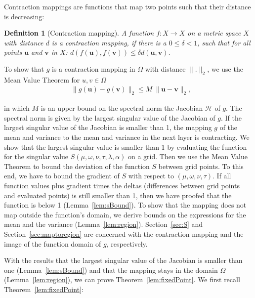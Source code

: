 \documentclass{article}
\newtheorem{definition}{Definition}
\renewcommand{\leq}{\leqslant}
\begin{document}
Contraction mappings are functions that map two points such that their distance is decreasing:
\begin{definition}[Contraction mapping]
 A function $f:X \to X$ on a metric space $X$ with distance $d$ is a contraction mapping, if there
 is a $0 \leq \delta < 1$, such that for all points $\bm u$ and $\bm v$ in $X$:
 $d(f(\bm u),f(\bm v)) \leq \delta d(\bm u,\bm v)$.
\end{definition}


To show that $g$ is a contraction mapping in $\Omega$ with distance $\| . \|_2$, we use the Mean Value 
Theorem for $u,v \in \Omega$
\begin{align}
& \| g(\bm u) - g(\bm v) \|_2 \leq  M  \     \| \bm u - \bm v \|_2, 
\end{align}

in which $M$ is an upper bound on the spectral norm the Jacobian $\mathcal H$ of $g$.
The spectral norm is given by the largest singular value of the Jacobian of $g$.
If the largest singular value of the Jacobian is smaller than 1, 
the mapping  $g$ of the mean and variance to the mean and variance in the next layer is contracting.
We show that the largest singular value is smaller than 1 by
evaluating the function for the singular value
$S(\mu, \omega, \nu, \tau, \lambda, \alpha)$ on a grid.
Then we use the Mean Value Theorem to bound the deviation of the
function $S$ between grid points. 
To this end, we have to bound the gradient of $S$ with respect to
$(\mu, \omega, \nu, \tau)$. If all function values plus
gradient times the deltas (differences between grid points and evaluated
points) is still smaller than 1, then we have proofed that the
function is below 1 (Lemma~\ref{lem:sBound}). To show that the mapping does not map outside the function's domain, we 
derive bounds on the expressions for the mean and the variance (Lemma~\ref{lem:region}).
Section~\ref{sec:S} and Section~\ref{sec:maptoregion} are concerned with the contraction mapping and 
the image of the function domain of $g$, respectively.

With the results that the largest singular value of the Jacobian is smaller than 
one (Lemma~\ref{lem:sBound}) and that the mapping stays in the domain $\Omega$
(Lemma~\ref{lem:region}), we can prove Theorem~\ref{lem:fixedPoint}.
We first recall Theorem~\ref{lem:fixedPoint}:
\end{document}
